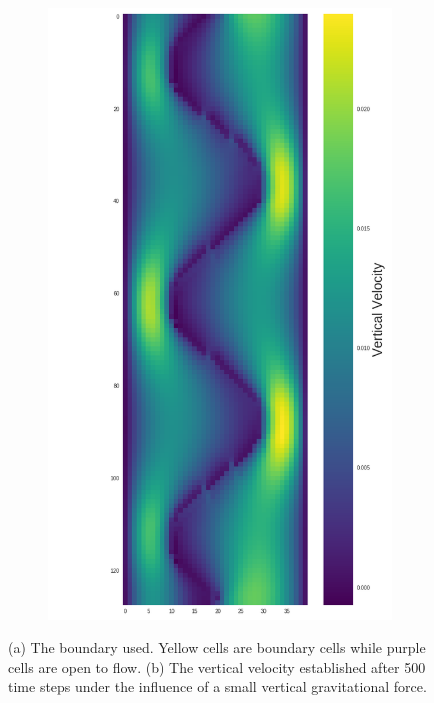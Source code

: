 \documentclass[]{article}
\begin{document}
\begin{figure}
\begin{subfigure}[b]{0.49\textwidth}
		\includegraphics[width=\linewidth]{figures/sin_boundary_result.png}
		\caption{}
		\label{fig:sin_boundary_result}
	\end{subfigure}
	\caption[]{(a) The boundary used. Yellow cells are boundary cells while purple cells are open to flow. (b) The vertical velocity established after 500 time steps under the influence of a small vertical gravitational force.}
	\label{fig:sin_boundary_all}
\end{figure}
\end{document}
